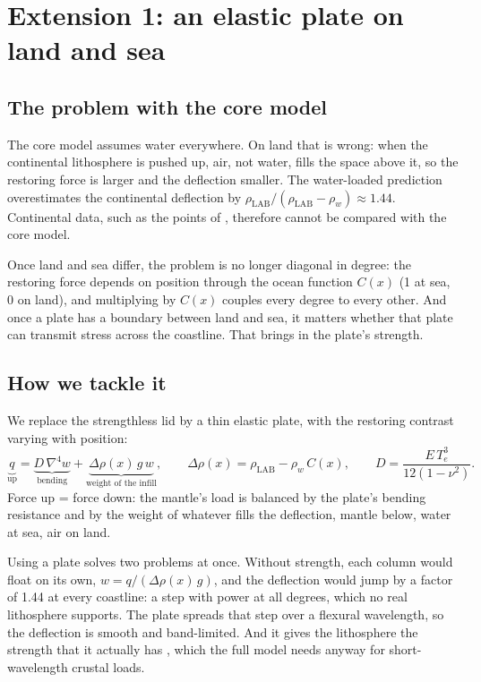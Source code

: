 \chapter{Extension 1: an elastic plate on land and sea}
\label{ch:plate}

\section{The problem with the core model}

The core model assumes water everywhere.
On land that is wrong: when the continental lithosphere is pushed up, air, not water, fills the space above it, so the restoring force is larger and the deflection smaller.
The water-loaded prediction overestimates the continental deflection by $\rho_{\mathrm{LAB}}/(\rho_{\mathrm{LAB}}-\rho_w)\approx 1.44$.
Continental data, such as the points of \citet{stephenson_continental_2024}, therefore cannot be compared with the core model.

Once land and sea differ, the problem is no longer diagonal in degree: the restoring force depends on position through the ocean function $C(x)$ (1 at sea, 0 on land), and multiplying by $C(x)$ couples every degree to every other.
And once a plate has a boundary between land and sea, it matters whether that plate can transmit stress across the coastline.
That brings in the plate's strength.

\section{How we tackle it}

We replace the strengthless lid by a thin elastic plate, with the restoring contrast varying with position:
\begin{equation}
    \underbrace{q}_{\text{up}} =
    \underbrace{D\,\nabla^4 w}_{\text{bending}} +
    \underbrace{\Delta\rho(x)\,g\,w}_{\text{weight of the infill}},
    \qquad
    \Delta\rho(x) = \rho_{\mathrm{LAB}} - \rho_w\,C(x),
    \qquad
    D = \frac{E\,T_e^3}{12(1-\nu^2)} .
\end{equation}
Force up = force down: the mantle's load is balanced by the plate's bending resistance and by the weight of whatever fills the deflection, mantle below, water at sea, air on land.

Using a plate solves two problems at once.
Without strength, each column would float on its own, $w = q/(\Delta\rho(x)\,g)$, and the deflection would jump by a factor of 1.44 at every coastline: a step with power at all degrees, which no real lithosphere supports.
The plate spreads that step over a flexural wavelength, so the deflection is smooth and band-limited.
And it gives the lithosphere the strength that it actually has \citep{watts2001isostasy}, which the full model needs anyway for short-wavelength crustal loads.

